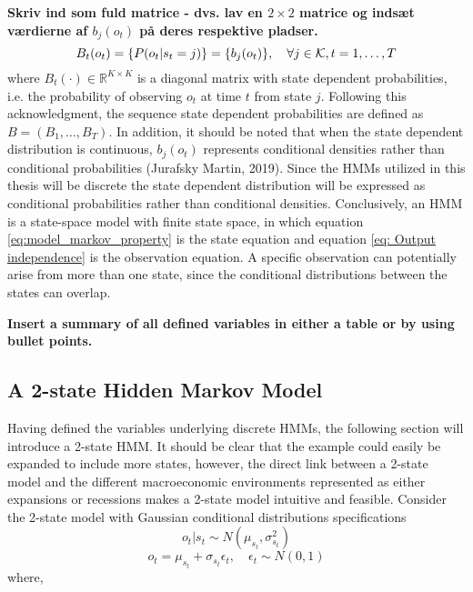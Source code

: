 \textbf{Skriv ind som fuld matrice - dvs. lav en $2\times2$ matrice og indsæt værdierne af $b_j(o_t)$ på deres respektive pladser.}
\begin{equation}
    B_t(o_t)= \{ P(o_t|s_t=j) \} = \{ b_j(o_t) \}, \quad \forall j \in \operatorname{\mathcal{K}}, t=1,\ldots,T 
\end{equation}
where $B_t(\cdot)\in \mathbb{R}^{K\times K}$ is a diagonal matrix with state dependent probabilities, i.e. the probability of observing $o_t$ at time $t$ from state $j$. Following this acknowledgment, the sequence state dependent probabilities are defined as $B=(B_1,\ldots,B_T)$. In addition, it should be noted that when the state dependent distribution is continuous, $b_j(o_t)$ represents conditional densities rather than conditional probabilities (Jurafsky Martin, 2019). Since the HMMs utilized in this thesis will be discrete the state dependent distribution will be expressed as conditional probabilities rather than conditional densities. Conclusively, an HMM is a state-space model with finite state space, in which equation \ref{eq:model_markov_property} is the state equation and equation \ref{eq: Output independence} is the observation equation. A specific observation can potentially arise from more than one state, since the conditional distributions between the states can overlap.

\textbf{Insert a summary of all defined variables in either a table or by using bullet points.}

\subsection{A 2-state Hidden Markov Model}
Having defined the variables underlying discrete HMMs, the following section will introduce a 2-state HMM. It should be clear that the example could easily be expanded to include more states, however, the direct link between a 2-state model and the different macroeconomic environments represented as either expansions or recessions makes a 2-state model intuitive and feasible. Consider the 2-state model with Gaussian conditional distributions specifications
\begin{equation}
     o_t|s_t \sim N(\mu_{s_t},\sigma^2_{s_t}) 
\end{equation}
\begin{equation}
   o_t = \mu_{s_t}  + \sigma_{s_t}\epsilon_{t}
   ,\quad \epsilon_{t} \sim N(0,1)   
\end{equation}
where,

